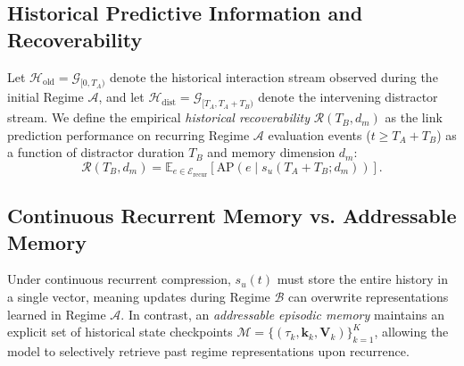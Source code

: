 \documentclass[10pt,twocolumn,letterpaper]{article}
\begin{document}
\subsection{Historical Predictive Information and Recoverability}
Let $\mathcal{H}_{\text{old}} = \mathcal{G}_{[0, T_A)}$ denote the historical interaction stream observed during the initial Regime $\mathcal{A}$, and let $\mathcal{H}_{\text{dist}} = \mathcal{G}_{[T_A, T_A + T_B)}$ denote the intervening distractor stream. We define the empirical \textit{historical recoverability} $\mathcal{R}(T_B, d_m)$ as the link prediction performance on recurring Regime $\mathcal{A}$ evaluation events ($t \ge T_A + T_B$) as a function of distractor duration $T_B$ and memory dimension $d_m$:
\begin{equation}
    \mathcal{R}(T_B, d_m) = \mathbb{E}_{e \in \mathcal{E}_{\text{recur}}} [\text{AP}(e \mid s_u(T_A + T_B; d_m))].
\end{equation}

\subsection{Continuous Recurrent Memory vs. Addressable Memory}
Under continuous recurrent compression, $s_u(t)$ must store the entire history in a single vector, meaning updates during Regime $\mathcal{B}$ can overwrite representations learned in Regime $\mathcal{A}$. In contrast, an \textit{addressable episodic memory} maintains an explicit set of historical state checkpoints $\mathcal{M} = \{(\tau_k, \mathbf{k}_k, \mathbf{V}_k)\}_{k=1}^K$, allowing the model to selectively retrieve past regime representations upon recurrence.
\end{document}
